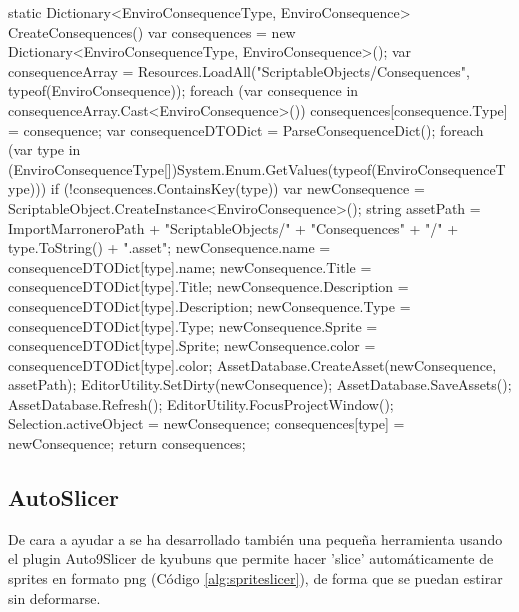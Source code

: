 \begin{mypython}[caption={Código para autogenerar ScriptableObject de tipo EnviroConsequences.},label={alg:enviroSO2}]
static Dictionary<EnviroConsequenceType, EnviroConsequence> CreateConsequences()
{
    var consequences = new Dictionary<EnviroConsequenceType, EnviroConsequence>();
    var consequenceArray = Resources.LoadAll("ScriptableObjects/Consequences", typeof(EnviroConsequence));
    foreach (var consequence in consequenceArray.Cast<EnviroConsequence>())
    {
        consequences[consequence.Type] = consequence;
    }
    var consequenceDTODict = ParseConsequenceDict();
    foreach (var type in (EnviroConsequenceType[])System.Enum.GetValues(typeof(EnviroConsequenceType)))
    {
        if (!consequences.ContainsKey(type))
        {
            var newConsequence = ScriptableObject.CreateInstance<EnviroConsequence>();
            string assetPath = ImportMarroneroPath + "ScriptableObjects/" + "Consequences" + "/" + type.ToString() + ".asset";
            newConsequence.name = consequenceDTODict[type].name;
            newConsequence.Title = consequenceDTODict[type].Title;
            newConsequence.Description = consequenceDTODict[type].Description;
            newConsequence.Type = consequenceDTODict[type].Type;
            newConsequence.Sprite = consequenceDTODict[type].Sprite;
            newConsequence.color = consequenceDTODict[type].color;
            AssetDatabase.CreateAsset(newConsequence, assetPath);
            EditorUtility.SetDirty(newConsequence);
            AssetDatabase.SaveAssets();
            AssetDatabase.Refresh();
            EditorUtility.FocusProjectWindow();
            Selection.activeObject = newConsequence;
            consequences[type] = newConsequence;
        }
    }
    return consequences;
}
\end{mypython}

\subsection{AutoSlicer}

De cara a ayudar a \nombrecoautorespacio se ha desarrollado también una pequeña herramienta usando el plugin Auto9Slicer\cite{Auto9Slicer} de kyubuns que permite hacer 'slice' automáticamente de sprites en formato png (Código \ref{alg:spriteslicer}), de forma que se puedan estirar sin deformarse. 

